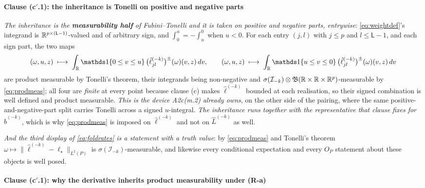 \paragraph{Clause \textup{(c$'$.1)}: the inheritance is Tonelli on positive and negative parts}

\emph{The inheritance is the
\textbf{measurability half} of Fubini--Tonelli and it is taken on positive and negative parts,
entrywise}: \eqref{eq:weightdef}'s integrand is $\mathbb{R}^{p\times(\mathsf L-1)}$-valued and
of arbitrary sign, and $\int_0^u=-\int_u^0$ when $u<0$. For each entry $(j,l)$ with $j\le p$ and
$l\le\mathsf L-1$, and each sign part, the
two maps
\[
(\omega,u,z)\;\longmapsto\;\int_\IR\un\{0\le v\le u\}\,\big(\hat\ell^{(-k)}_{jl}\big)^{\pm}(\omega)(v,z)\,dv,
\qquad
(\omega,u,z)\;\longmapsto\;\int_\IR\un\{u\le v\le0\}\,\big(\hat\ell^{(-k)}_{jl}\big)^{\pm}(\omega)(v,z)\,dv
\]
are product measurable by Tonelli's theorem, their integrands being non-negative and
$\sigma(\mathcal I_{-k})\otimes\mathfrak B(\mathbb{R}\times\mathbb{R}\times\mathbb{R}^{p})$-measurable by \eqref{eq:prodmeas};
all four are \emph{finite} at every point because clause \textup{(c)} makes $\hat\ell^{(-k)}$ bounded at
each realisation, so their signed combination is well defined and product measurable. \emph{This is the
device A2c\textup{(m.2)} already owns}, on the other side of the
pairing, where the same positive-and-negative-part split carries Tonelli across a signed
$u$-integral. \emph{The inheritance runs together with the representative that clause fixes for
$\hat b^{(-k)}$}, which is why \eqref{eq:prodmeas} is imposed on $\hat\ell^{(-k)}$ and not on
$\hat L^{(-k)}$ as well.

\emph{And the third display of \eqref{eq:foldrates} is a statement with a truth value}: by
\eqref{eq:prodmeas} and Tonelli's theorem
$\omega\mapsto\|\hat\ell^{(-k)}-\ell_\star\|_{L^{2}(P)}$ is $\sigma(\mathcal I_{-k})$-measurable, and
likewise every conditional expectation and every $O_P$ statement about these objects is well posed.

\paragraph{Clause \textup{(c$'$.1)}: why the derivative inherits product measurability under (R-a)}

